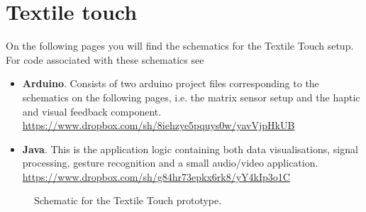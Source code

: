 \section{Textile touch}
\label{app:textile-touch}

On the following pages you will find the schematics for the Textile Touch setup.
For code associated with these schematics see
\begin{itemize}
	\item{\textbf{Arduino}. Consists of two arduino project files corresponding to the schematics on the following pages, i.e. the matrix sensor setup and the haptic and visual feedback component.\\
		\url{https://www.dropbox.com/sh/8iehzye5pquys0w/yavVjpHkUB} } 
	\item{\textbf{Java}. This is the application logic containing both data visualisations, signal processing, gesture recognition and a small audio/video application.\\
	 \url{https://www.dropbox.com/sh/g84hr73epkx6rk8/yY4kIp3o1C} } 
\end{itemize}

\begin{landscape}
	\thispagestyle{empty}
	\centering
	\begin{figure}[p]
	    \caption{Schematic for the Textile Touch prototype.}
	\end{figure}
\end{landscape}

